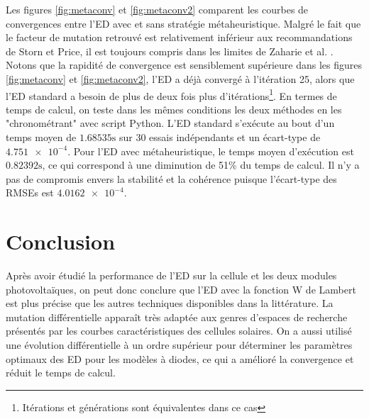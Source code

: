 Les figures \ref{fig:metaconv} et \ref{fig:metaconv2} comparent les courbes de convergences entre l'ED avec et sans stratégie métaheuristique. Malgré le fait que le facteur de mutation retrouvé est relativement inférieur aux recommandations de Storn et Price, il est toujours compris dans les limites de Zaharie et al. \cite{Zaharie2002}. Notons que la rapidité de convergence est sensiblement supérieure dans les figures \ref{fig:metaconv} et \ref{fig:metaconv2}, l'ED a déjà convergé à l'itération 25, alors que l'ED standard a besoin de plus de deux fois plus d'itérations\footnote{Itérations et générations sont équivalentes dans ce cas}. En termes de temps de calcul, on teste dans les mêmes conditions les deux méthodes en les "chronométrant" avec script Python. L'ED standard s'exécute au bout d'un temps moyen de $1.68535 \si{\second}$ sur 30 essais indépendants et un écart-type de $\num{4.751e-4}$. Pour l'ED avec métaheuristique, le temps moyen d'exécution est $0.82392 \si{\second}$, ce qui correspond à une diminution de 51\% du temps de calcul. Il n'y a pas de compromis envers la stabilité et la cohérence puisque l'écart-type des RMSEs est $\num{4.0162e-4}$. 

\section{Conclusion}
Après avoir étudié la performance de l'ED sur la cellule et les deux modules photovoltaïques, on peut donc conclure que l'ED avec la fonction W de Lambert est plus précise que les autres techniques disponibles dans la littérature. La mutation différentielle apparaît très adaptée aux genres d'espaces de recherche présentés par les courbes caractéristiques des cellules solaires. On a aussi utilisé une évolution différentielle à un ordre supérieur pour déterminer les paramètres optimaux des ED pour les modèles à diodes, ce qui a amélioré la convergence et réduit le temps de calcul.

